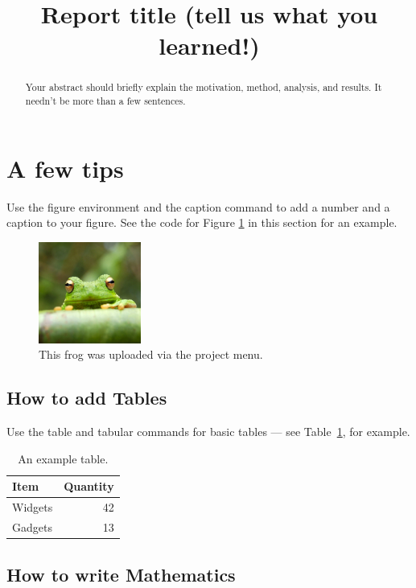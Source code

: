 \documentclass[a4paper]{article}
\title{Report title (tell us what you learned!)}
\date{}
\begin{document}
\maketitle

\begin{abstract}
Your abstract should briefly explain the motivation, method, analysis, and results. It needn't be more than
a few sentences.
\end{abstract}

\section{A few tips}

Use the figure environment and the caption command to add a number and a caption to your figure. See the code for Figure \ref{fig:frog} in this section for an example.

\begin{figure}
\centering
\includegraphics[width=0.3\textwidth]{frog.jpg}
\caption{\label{fig:frog}This frog was uploaded via the project menu.}
\end{figure}

\subsection{How to add Tables}

Use the table and tabular commands for basic tables --- see Table~\ref{tab:widgets}, for example. 

\begin{table}
\centering
\begin{tabular}{lr}\hline\hline
Item & Quantity \\\hline
Widgets & 42 \\
Gadgets & 13
\end{tabular}
\caption{\label{tab:widgets}An example table.}
\end{table}

\subsection{How to write Mathematics}
\end{document}
